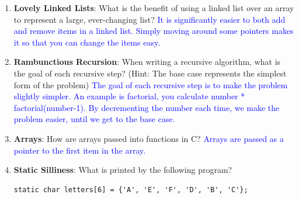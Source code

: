 \documentclass{article}
\begin{document}
\begin{enumerate}[label=(\alph*)]
    \item \textbf{Lovely Linked Lists}: What is the benefit of using a linked list over an array to represent a large, ever-changing list?
    \newline\textcolor{blue}{It is significantly easier to both add and remove items in a linked list. Simply moving around some pointers makes it so that you can change the items easy.
    }
    \item \textbf{Rambunctious Recursion}: When writing a recursive algorithm, what is the goal of each recursive step? (Hint: The base case represents the simplest form of the problem)
    \newline\textcolor{blue}{The goal of each recursive step is to make the problem slightly simpler. An example is factorial, you calculate number * factorial(number-1). By decrementing the number each time, we make the problem easier, until we get to the base case.
    }
    \item \textbf{Arrays}: How are arrays passed into functions in C?
    \newline\textcolor{blue}{Arrays are passed as a pointer to the first item in the array. 
    }
    \item \textbf{Static Silliness}:  What is printed by the following program?
    \begin{lstlisting}[style=CStyle] 
static char letters[6] = {'A', 'E', 'F', 'D', 'B', 'C'};


\end{lstlisting}
\end{enumerate}
\end{document}
